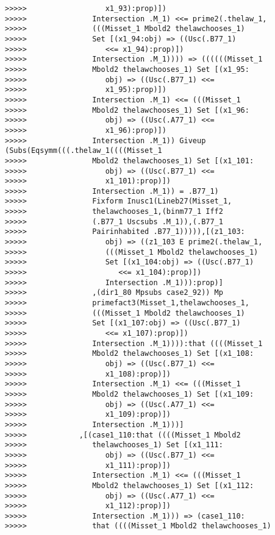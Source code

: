 \documentclass[12pt]{article}
\begin{document}
\begin{verbatim}
>>>>>                  x1_93):prop)])
>>>>>               Intersection .M_1) <<= prime2(.thelaw_1,
>>>>>               (((Misset_1 Mbold2 thelawchooses_1)
>>>>>               Set [(x1_94:obj) => ((Usc(.B77_1)
>>>>>                  <<= x1_94):prop)])
>>>>>               Intersection .M_1)))) => ((((((Misset_1
>>>>>               Mbold2 thelawchooses_1) Set [(x1_95:
>>>>>                  obj) => ((Usc(.B77_1) <<=
>>>>>                  x1_95):prop)])
>>>>>               Intersection .M_1) <<= (((Misset_1
>>>>>               Mbold2 thelawchooses_1) Set [(x1_96:
>>>>>                  obj) => ((Usc(.A77_1) <<=
>>>>>                  x1_96):prop)])
>>>>>               Intersection .M_1)) Giveup (Subs(Eqsymm(((.thelaw_1((((Misset_1
>>>>>               Mbold2 thelawchooses_1) Set [(x1_101:
>>>>>                  obj) => ((Usc(.B77_1) <<=
>>>>>                  x1_101):prop)])
>>>>>               Intersection .M_1)) = .B77_1)
>>>>>               Fixform Inusc1(Lineb27(Misset_1,
>>>>>               thelawchooses_1,(binm77_1 Iff2
>>>>>               (.B77_1 Uscsubs .M_1)),(.B77_1
>>>>>               Pairinhabited .B77_1))))),[(z1_103:
>>>>>                  obj) => ((z1_103 E prime2(.thelaw_1,
>>>>>                  (((Misset_1 Mbold2 thelawchooses_1)
>>>>>                  Set [(x1_104:obj) => ((Usc(.B77_1)
>>>>>                     <<= x1_104):prop)])
>>>>>                  Intersection .M_1))):prop)]
>>>>>               ,(dir1_80 Mpsubs case2_92)) Mp
>>>>>               primefact3(Misset_1,thelawchooses_1,
>>>>>               (((Misset_1 Mbold2 thelawchooses_1)
>>>>>               Set [(x1_107:obj) => ((Usc(.B77_1)
>>>>>                  <<= x1_107):prop)])
>>>>>               Intersection .M_1)))):that ((((Misset_1
>>>>>               Mbold2 thelawchooses_1) Set [(x1_108:
>>>>>                  obj) => ((Usc(.B77_1) <<=
>>>>>                  x1_108):prop)])
>>>>>               Intersection .M_1) <<= (((Misset_1
>>>>>               Mbold2 thelawchooses_1) Set [(x1_109:
>>>>>                  obj) => ((Usc(.A77_1) <<=
>>>>>                  x1_109):prop)])
>>>>>               Intersection .M_1)))]
>>>>>            ,[(case1_110:that ((((Misset_1 Mbold2
>>>>>               thelawchooses_1) Set [(x1_111:
>>>>>                  obj) => ((Usc(.B77_1) <<=
>>>>>                  x1_111):prop)])
>>>>>               Intersection .M_1) <<= (((Misset_1
>>>>>               Mbold2 thelawchooses_1) Set [(x1_112:
>>>>>                  obj) => ((Usc(.A77_1) <<=
>>>>>                  x1_112):prop)])
>>>>>               Intersection .M_1))) => (case1_110:
>>>>>               that ((((Misset_1 Mbold2 thelawchooses_1)

\end{verbatim}
\end{document}

